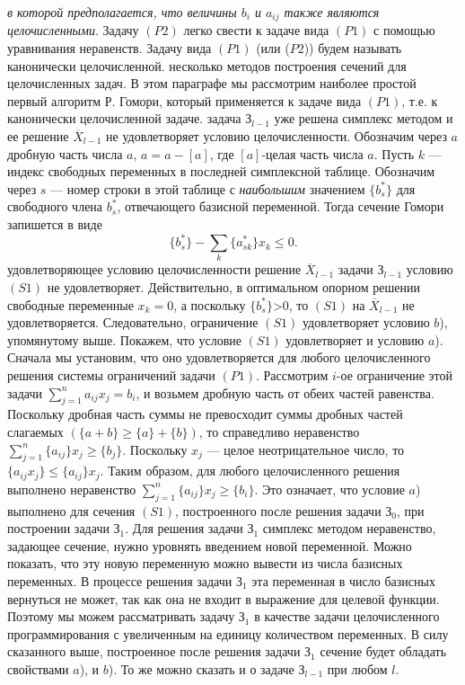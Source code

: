 \textit{в которой предполагается, что величины $b_i$ и $a_{ij}$ также являются целочисленными}. Задачу $(P2)$ легко свести к задаче вида $(P1)$ с помощью уравнивания неравенств. Задачу вида $(P1)$ (или ($P2$)) будем называть канонически целочисленной.
 несколько методов построения сечений для целочисленных задач. В этом параграфе мы рассмотрим наиболее простой первый алгоритм Р. Гомори, который применяется к задаче вида $(P1)$, т.е. к канонически целочисленной задаче.
 задача З$_{l-1}$ уже решена симплекс методом и ее решение $\overline{X}_{l-1}$ не удовлетворяет условию целочисленности. Обозначим через ${a}$ дробную часть числа $a$, ${a}=a-[a]$, где $[a]$-целая часть числа $a$. Пусть $k$ — индекс свободных переменных в последней симплексной таблице. Обозначим через $s$ — номер строки в этой таблице с \textit{наибольшим} значением $\{b_s^*\}$ для свободного члена $b_s^*$, отвечающего базисной переменной. Тогда сечение Гомори запишется в виде
\begin{equation}
\label{equation_5_4}
	\{b_s^*\} - \sum_k\{a_{sk}^*\}x_k \leq 0.
\tag{$S_1$}
\end{equation}
 удовлетворяющее условию целочисленности  решение $\overline{X}_{l-1}$ задачи З$_{l-1}$ условию $(S1)$ не удовлетворяет. Действительно, в оптимальном опорном решении свободные переменные $x_k=0$, а поскольку $\{b_s^*\}$>0, то $(S1)$ на $\overline{X}_{l-1}$ не удовлетворяется. Следовательно, ограничение $(S1)$ удовлетворяет условию $b$), упомянутому выше. Покажем, что условие $(S1)$ удовлетворяет и условию $a$). Сначала мы установим, что оно удовлетворяется для любого целочисленного решения системы ограничений задачи $(P1)$. Рассмотрим $i$-ое ограничение этой задачи $\sum_{j=1}^n a_{ij}x_j = b_i$, и возьмем дробную часть от обеих частей равенства. Поскольку дробная часть суммы не превосходит суммы дробных частей слагаемых $(\{a+b\} \geq \{a\}+\{b\})$, то справедливо неравенство $\sum_{j=1}^n \{ a_{ij}\} x_j \geq \{ b_j \} $. Поскольку $x_j$ — целое неотрицательное число, то $ \{ a_{ij}x_j \} \leq \{ a_{ij} \} x_j $. Таким образом, для любого целочисленного решения выполнено неравенство $\sum_{j=1}^n \{ a_{ij} \} x_j \geq \{ b_i \} $. Это означает, что условие $a$) выполнено для сечения $(S1)$, построенного после решения задачи З$_0$, при построении задачи З$_1$. Для решения задачи З$_1$ симплекс методом неравенство, задающее сечение, нужно уровнять введением новой переменной. Можно показать, что эту новую переменную можно вывести из числа базисных переменных. В процессе решения задачи З$_1$ эта переменная в число базисных вернуться не может, так как она не входит в выражение для целевой функции. Поэтому мы можем рассматривать задачу З$_1$ в качестве задачи целочисленного программирования с увеличенным на единицу количеством переменных. В силу сказанного выше, построенное после решения задачи З$_1$ сечение будет обладать свойствами $a$), и $b$). То же можно сказать и о задаче З$_{l-1}$ при любом $l$.
